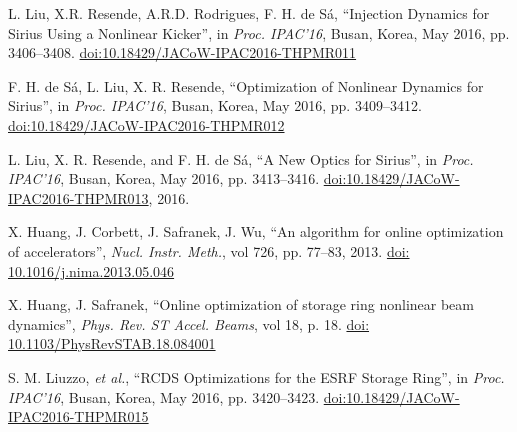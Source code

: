 \documentclass[a4paper,
               keeplastbox,   %
               ]{jacow}
\begin{document}
	\begin{thebibliography}{9} %
	
        

        L. Liu, X.R. Resende, A.R.D. Rodrigues, F. H. de Sá,
       \textquotedblleft{{I}njection {D}ynamics for {S}irius {U}sing a {N}onlinear {K}icker}\textquotedblright,
       in \emph{Proc. IPAC’16}, Busan, Korea, May 2016, pp. 3406--3408.
       \url{doi:10.18429/JACoW-IPAC2016-THPMR011} 
 
        F. H. de Sá, L. Liu, X. R. Resende,
       \textquotedblleft{{O}ptimization of {N}onlinear {D}ynamics for {S}irius}\textquotedblright,
       in \emph{Proc. IPAC’16}, Busan, Korea, May 2016, pp. 3409--3412.
       \url{doi:10.18429/JACoW-IPAC2016-THPMR012}

       L. Liu, X. R. Resende, and F. H. de Sá,
       \textquotedblleft{A New Optics for Sirius}\textquotedblright,
     in \emph{Proc. IPAC'16}, Busan, Korea, May 2016, pp. 3413--3416.
       \url{doi:10.18429/JACoW-IPAC2016-THPMR013}, 2016.
           
		X. Huang, J. Corbett, J. Safranek, J. Wu,
		\textquotedblleft{An algorithm for online optimization of accelerators}\textquotedblright,
		\emph{Nucl.  Instr. Meth.}, vol 726, pp. 77--83, 2013.
        \url{doi: 10.1016/j.nima.2013.05.046}

		X. Huang, J. Safranek,
		\textquotedblleft{Online optimization of storage ring nonlinear beam dynamics}\textquotedblright,
		\emph{Phys. Rev. ST Accel. Beams}, vol 18, p. 18.
        \url{doi: 10.1103/PhysRevSTAB.18.084001} 
 
        S. M. Liuzzo, \emph{et al.},
        \textquotedblleft{RCDS Optimizations for the ESRF Storage Ring}\textquotedblright,
        in \emph{Proc. IPAC’16}, Busan, Korea, May 2016, pp. 3420--3423.
       \url{doi:10.18429/JACoW-IPAC2016-THPMR015}   
    

\end{thebibliography}
\end{document}

